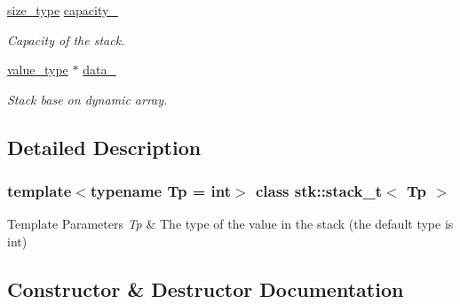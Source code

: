 \begin{DoxyCompactItemize}
\mbox{\label{classstk_1_1stack__t_ace387ef68b512dd54537f2c8ebe3d0d5}} 
\hyperlink{classstk_1_1stack__t_a591d5ffc540c9f27e5618f9aa4d67cad}{size\+\_\+type} \hyperlink{classstk_1_1stack__t_ace387ef68b512dd54537f2c8ebe3d0d5}{capacity\+\_\+}
\begin{DoxyCompactList}\small\item\em Capacity of the stack. \end{DoxyCompactList}\item 
\mbox{\label{classstk_1_1stack__t_a828b3c97415c648a9155e4f643d2ccb9}} 
\hyperlink{classstk_1_1stack__t_a2e10db77beb285902df2b32f30209067}{value\+\_\+type} $\ast$ \hyperlink{classstk_1_1stack__t_a828b3c97415c648a9155e4f643d2ccb9}{data\+\_\+}
\begin{DoxyCompactList}\small\item\em Stack base on dynamic array. \end{DoxyCompactList}\end{DoxyCompactItemize}


\subsection{Detailed Description}
\subsubsection*{template$<$typename Tp = int$>$\newline
class stk\+::stack\+\_\+t$<$ Tp $>$}


\begin{DoxyTemplParams}{Template Parameters}
{\em Tp} & The type of the value in the stack (the default type is int) \\
\hline
\end{DoxyTemplParams}


\subsection{Constructor \& Destructor Documentation}
\mbox{\label{classstk_1_1stack__t_acf68532e10f96d64c7745372dd1afba2}} 
